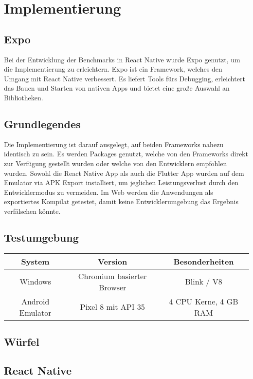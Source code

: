 \section{Implementierung}
\subsection{Expo}

Bei der Entwicklung der Benchmarks in React Native wurde Expo genutzt, um die Implementierung zu erleichtern. Expo ist ein Framework, welches den Umgang mit React Native verbessert. Es liefert Tools fürs Debugging, erleichtert das Bauen und Starten von nativen Apps und bietet eine große Auswahl an Bibliotheken.

\subsection{Grundlegendes}

Die Implementierung ist darauf ausgelegt, auf beiden Frameworks nahezu identisch zu sein. Es werden Packages genutzt, welche von den Frameworks direkt zur Verfügung gestellt wurden oder welche von den Entwicklern empfohlen wurden. Sowohl die React Native App als auch die Flutter App wurden auf dem Emulator via APK Export installiert, um jeglichen Leistungsverlust durch den Entwicklermodus zu vermeiden. Im Web werden die Anwendungen als exportiertes Kompilat getestet, damit keine Entwicklerumgebung das Ergebnis verfälschen könnte.

\subsection{Testumgebung}
\begin{table}[h!]
\centering
\begin{tabular}{|c|c|c|}
\hline
\textbf{System} & \textbf{Version} & \textbf{Besonderheiten} \\
\hline
Windows & Chromium basierter Browser & Blink / V8 \\
\hline
Android Emulator & Pixel 8 mit API 35 & 4 CPU Kerne, 4 GB RAM \\
\hline
\end{tabular}
\end{table}

\subsection{Würfel}

\subsection*{React Native}

